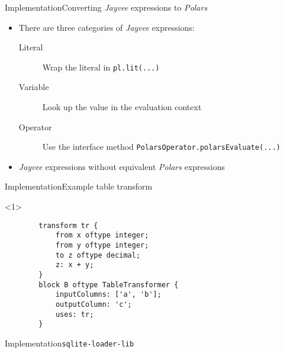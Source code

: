 \begin{frame}[t]{Implementation}{Converting \emph{Jayvee} expressions to \emph{Polars}}
	\begin{itemize}
		\item There are three categories of \emph{Jayvee} expressions\footnotemark[1]:
		      \begin{description}
			      \item[Literal] Wrap the literal in \Verb|pl.lit(...)|
			      \item[Variable] Look up the value in the evaluation context
			      \item[Operator] Use the interface method \Verb|PolarsOperator.polarsEvaluate(...)|
		      \end{description}
		\item<2-> \emph{Jayvee} expressions without equivalent \emph{Polars} expressions
	\end{itemize}

\end{frame}
\begin{frame}[fragile]{Implementation}{Example table transform}
	\begin{onlyenv}
		\begin{verbatim}
		transform tr {
			from x oftype integer;
			from y oftype integer;
			to z oftype decimal;
			z: x + y;
		}
		block B oftype TableTransformer {
			inputColumns: ['a', 'b'];
			outputColumn: 'c';
			uses: tr;
		}
		\end{verbatim}
	\end{onlyenv}
	 {
		\begin{figure}
			
		\end{figure}
	}
\end{frame}
\begin{frame}[t]{Implementation}{\Verb|sqlite-loader-lib|}
	\begin{figure}
		
	\end{figure}
\end{frame}
